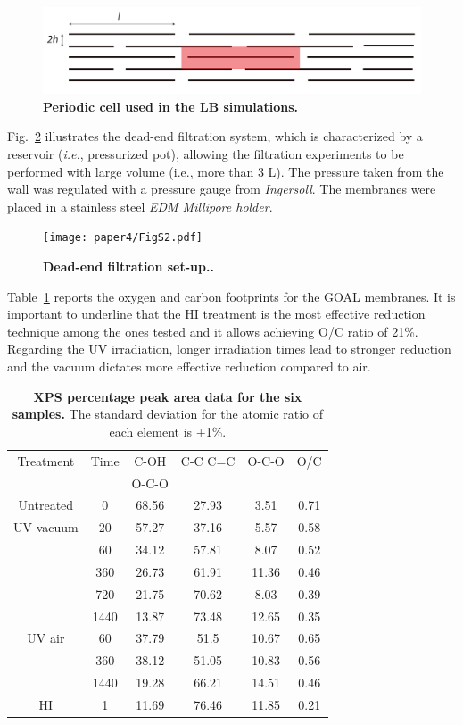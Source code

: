 \begin{figure}[h!]
  \centering
  \includegraphics[width=5in]{paper4/FigS1.pdf}
  \caption{\textbf{Periodic cell used in the LB simulations.}}
  \label{figS1_AppC}
\end{figure}

Fig.~\ref{figS2_AppC} illustrates the dead-end filtration system, which is characterized by a reservoir (\textit{i.e.},
pressurized pot), allowing the filtration experiments to be performed with large volume (i.e.,
more than 3 L). The pressure taken from the wall was regulated with a pressure gauge from \textit{Ingersoll}. The membranes were placed in a stainless steel \textit{EDM Millipore holder}. 

\begin{figure}[h!]
  \centering
  \texttt{[image: paper4/FigS2.pdf]}
  \caption{\textbf{Dead-end filtration set-up..}}
  \label{figS2_AppC}
\end{figure}


Table~\ref{tblS1_AppC} reports the oxygen and carbon footprints for the GOAL membranes. It is important to underline that the HI treatment is the most effective reduction technique among the ones tested and it allows achieving O/C ratio of 21\%. Regarding the UV irradiation, longer irradiation times lead to stronger reduction and the vacuum dictates more effective reduction compared to air. 

\begin{table}[t!]
 \begin{center}
 \caption{\textbf{XPS percentage peak area data for the six samples.} The standard deviation for the atomic ratio of each element is $\pm$1\%.}
  \label{tblS1_AppC}
  \begin{tabular}{*6c}
    Treatment & Time  & C-OH & C-C C=C & O-C-O & O/C \\
     &   & O-C-O &  & &  \\
    \hline
    Untreated &0 &68.56& 27.93 &3.51 &0.71 \\
    UV vacuum &20&57.27& 37.16& 5.57 &0.58\\
             & 60& 34.12& 57.81& 8.07& 0.52\\
             &360& 26.73& 61.91& 11.36 &0.46\\
             &720& 21.75 &70.62& 8.03& 0.39\\
             &1440& 13.87& 73.48& 12.65 &0.35\\
    UV air   &60 &37.79 &51.5& 10.67 &0.65\\
            &360& 38.12 &51.05& 10.83 &0.56\\
            &1440& 19.28& 66.21& 14.51& 0.46\\
    HI      & 1   &11.69 &76.46 &11.85 &0.21\\
    \hline
  \end{tabular}
 \end{center}
\end{table}


